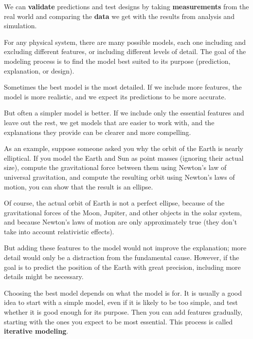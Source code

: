 \documentclass[
]{book}
\numberwithin{Answer}{chapter}
\numberwithin{Exercise}{chapter}
\begin{document}

We can {\bf validate} predictions and test designs by taking {\bf measurements} from the real world and comparing the {\bf data} we get with the results from analysis and simulation. 


For any physical system, there are many possible models, each one including and excluding different features, or including different levels of detail.  The goal of the modeling process is to find the model best suited to its purpose (prediction, explanation, or design).


Sometimes the best model is the most detailed.  If we include more features, the model is more realistic, and we expect its predictions to be more accurate.


But often a simpler model is better.  If we include only the essential features and leave out the rest, we get models that are easier to work with, and the explanations they provide can be clearer and more compelling.


As an example, suppose someone asked you why the orbit of the Earth is nearly elliptical.  If you model the Earth and Sun as point masses (ignoring their actual size), compute the gravitational force between them using Newton's law of universal gravitation, and compute the resulting orbit using Newton's laws of motion, you can show that the result is an ellipse.


Of course, the actual orbit of Earth is not a perfect ellipse, because of the gravitational forces of the Moon, Jupiter, and other objects in the solar system, and because Newton's laws of motion are only approximately true (they don't take into account relativistic effects).


But adding these features to the model would not improve the explanation; more detail would only be a distraction from the fundamental cause.  However, if the goal is to predict the position of the Earth with great precision, including more details might be necessary.  

Choosing the best model depends on what the model is for.  It is usually a good idea to start with a simple model, even if it is likely to be too simple, and test whether it is good enough for its purpose.  Then you can add features gradually, starting with the ones you expect to be most essential.  This process is called {\bf iterative modeling}.
\end{document}
